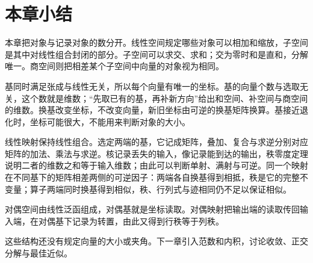 \section{本章小结}
\label{sec:ls-representation-summary}

本章把对象与记录对象的数分开。线性空间规定哪些对象可以相加和缩放，子空间是其中对线性组合封闭的部分。子空间可以求交、求和；交为零时和是直和，分解唯一。商空间则把相差某个子空间中向量的对象视为相同。

基同时满足张成与线性无关，所以每个向量有唯一的坐标。基的向量个数与选取无关，这个数就是维数；“先取已有的基，再补新方向”给出和空间、补空间与商空间的维数。换基改变坐标，不改变向量，新旧坐标由可逆的换基矩阵换算。基接近退化时，坐标可能很大，不能用来判断对象的大小。

线性映射保持线性组合。选定两端的基，它记成矩阵，叠加、复合与求逆分别对应矩阵的加法、乘法与求逆。核记录丢失的输入，像记录能到达的输出，秩零度定理说明二者的维数之和等于输入维数；由此可以判断单射、满射与可逆。同一个映射在不同基下的矩阵相差两侧的可逆因子：两端各自换基得到相抵，秩是它的完整不变量；算子两端同时换基得到相似，秩、行列式与迹相同仍不足以保证相似。

对偶空间由线性泛函组成，对偶基就是坐标读取。对偶映射把输出端的读取传回输入端，在对偶基下记录为转置，由此又得到行秩等于列秩。

这些结构还没有规定向量的大小或夹角。下一章引入范数和内积，讨论收敛、正交分解与最佳近似。
